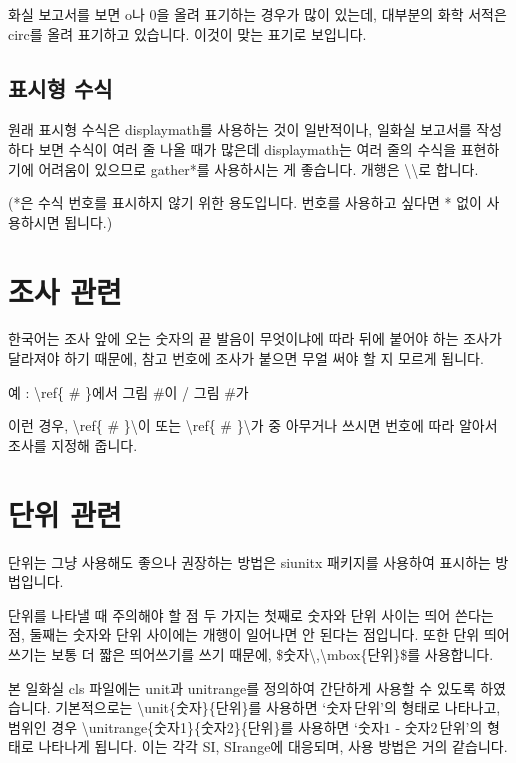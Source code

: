 \documentclass[a4paper,10pt]{article}
\begin{document}
	화실 보고서를 보면 o나 0을 올려 표기하는 경우가 많이 있는데, 대부분의 
	화학 서적은 circ를 올려 표기하고 있습니다. 이것이 맞는 표기로 보입니다.
	
	\subsection{표시형 수식}
	원래 표시형 수식은 displaymath를 사용하는 것이 일반적이나,
	일화실 보고서를 작성하다 보면 수식이 여러 줄 나올 때가 많은데
	displaymath는 여러 줄의 수식을 표현하기에 어려움이 있으므로
	gather*를 사용하시는 게 좋습니다.
	개행은 \textbackslash\textbackslash 로 합니다.
	
	(*은 수식 번호를 표시하지 않기 위한 용도입니다.
	번호를 사용하고 싶다면 * 없이 사용하시면 됩니다.)
	
	\section{조사 관련}
	한국어는 조사 앞에 오는 숫자의 끝 발음이 무엇이냐에 따라
	뒤에 붙어야 하는 조사가 달라져야 하기 때문에,
	참고 번호에 조사가 붙으면 무얼 써야 할 지 모르게 됩니다.
	
	예 : \textbackslash ref\{ \# \}에서 그림 \#이 / 그림 \#가
	
	이런 경우, \textbackslash ref\{ \# \}\textbackslash 이 또는
	\textbackslash ref\{ \# \}\textbackslash 가 중 아무거나 쓰시면
	번호에 따라 알아서 조사를 지정해 줍니다. 
	
	\section{단위 관련}
	단위는 그냥 사용해도 좋으나 권장하는 방법은 siunitx 패키지를 사용하여
	표시하는 방법입니다.
	
	단위를 나타낼 때 주의해야 할 점 두 가지는 첫째로 숫자와 단위 사이는 
	띄어 쓴다는 점, 둘째는 숫자와 단위 사이에는 개행이 일어나면 안 된다는 
	점입니다. 또한 단위 띄어쓰기는 보통 더 짧은 띄어쓰기를 쓰기 때문에,
	\$숫자\textbackslash,\textbackslash mbox\{단위\}\$를 사용합니다.
	
	본 일화실 cls 파일에는 unit과 unitrange를
	정의하여 간단하게 사용할 수 있도록 하였습니다. 기본적으로는
	\textbackslash unit\{숫자\}\{단위\}를 사용하면 
	`$\mbox{숫자}\,\mbox{단위}$'의 형태로 나타나고, 범위인 경우
	\textbackslash unitrange\{숫자1\}\{숫자2\}\{단위\}를 사용하면
	`$\mbox{숫자1 - 숫자2}\,\mbox{단위}$'의 형태로 나타나게 됩니다.
	이는 각각 SI, SIrange에 대응되며, 사용 방법은 거의 같습니다.
	
\end{document}

